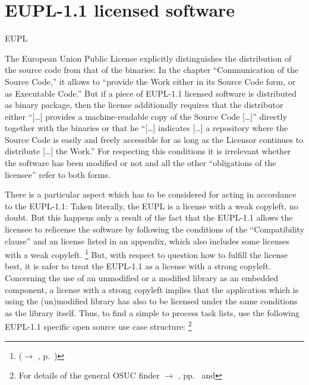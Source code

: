 \section{EUPL-1.1 licensed software}
\begin{license}{EUPL} %

The European Union Public License explicitly distinguishes the distribution of
the source code from that of the binaries: In the chapter \enquote{Communication
of the Source Code,} it allows to \enquote{provide the Work either in its Source
Code form, or as Executable Code.} But if a piece of EUPL-1.1 licensed
software is distributed as binary package, then the license additionally
requires that the distributor either \enquote{[\ldots] provides a
machine-readable copy of the Source Code [\ldots]} directly together with the
binaries or that he \enquote{[\ldots] indicates [\ldots] a
repository where the Source Code is easily and freely accessible for as long 
as the Licensor continues to distribute [\ldots] the Work.} For
respecting this conditions it is irrelevant whether the software has been
modified or not and all the other \enquote{obligations of the licensee} refer to
both forms.

There is a particular aspect which has to be considered for acting in
accordance to the EUPL-1.1: Taken literally, the EUPL is a license with a weak
copyleft, no doubt. But this happens only a result of the fact that the EUPL-1.1
allows the licensee to relicense the software by following the conditions of the
\enquote{Compatibility clause} and an license listed in an
appendix, which also includes some licenses with a weak copyleft.%
  \footnote{($\rightarrow$ \oslic, p.\ )} 
But, with respect to question how to fulfill the license best, it is safer to
treat the EUPL-1.1 as a license with a strong copyleft. Concerning the use of an
unmodified or a modified library as an embedded component, a license with 
a strong copyleft implies that the application which is using the
(un)modified library has also to be licensed under the same conditions as the
library itself. 
Thus, to find a simple to process task lists, use the following EUPL-1.1
specific open source use case structure:%
  \footnote{For details of the general OSUC finder $\rightarrow$ \oslic,
    pp.\ \pageref{OsucTokens} and \pageref{OsucDefinitionTree}} 


\end{license}
